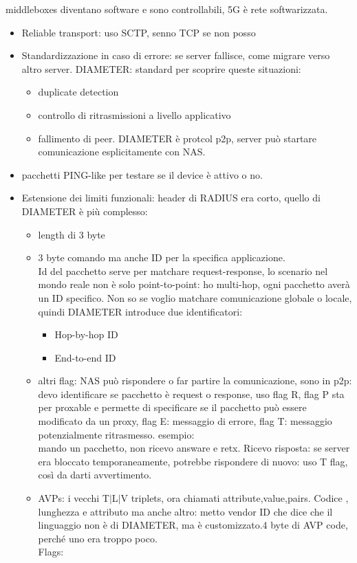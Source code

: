 \documentclass[16px]{article}
\begin{document}
middleboxes diventano software e sono controllabili, 5G è rete softwarizzata.\\
\begin{itemize}
\item Reliable transport: uso SCTP, senno TCP se non posso
\item Standardizzazione in caso di errore: se server fallisce, come migrare verso altro server. DIAMETER: standard per scoprire queste situazioni:
\begin{itemize}
\item duplicate detection
\item controllo di ritrasmissioni a livello applicativo
\item fallimento di peer. DIAMETER è protcol p2p, server può startare comunicazione esplicitamente con NAS.
\end{itemize}
\item pacchetti PING-like per testare se il device è attivo o no.
\item Estensione dei limiti funzionali: header di RADIUS era corto, quello di DIAMETER è più complesso:  
\begin{itemize}
\item length di 3 byte
\item 3 byte comando ma anche ID per la specifica applicazione.\\ Id del pacchetto serve per matchare request-response, lo scenario nel mondo reale non è solo point-to-point: ho multi-hop, ogni pacchetto averà un ID specifico. Non so se voglio matchare comunicazione globale o locale, quindi DIAMETER introduce due identificatori:
\begin{itemize}
\item Hop-by-hop ID
\item End-to-end ID
\end{itemize}
\item altri flag: NAS può rispondere o far partire la comunicazione, sono in p2p: devo identificare se pacchetto è request o response, uso flag R, flag P sta per proxable e permette di specificare se il pacchetto può essere modificato da un proxy, flag E: messaggio di errore, flag T: messaggio potenzialmente ritrasmesso. esempio: \\ mando un pacchetto, non ricevo answare e retx. Ricevo risposta: se server era bloccato temporaneamente, potrebbe rispondere di nuovo: uso T flag, così da darti avvertimento.
\item AVPs: i vecchi T$|$L$|$V triplets, ora chiamati attribute,value,pairs. Codice , lunghezza e attributo ma anche altro: metto vendor ID che dice che il linguaggio non è di DIAMETER, ma è customizzato.4 byte di AVP code, perché uno era troppo poco.\\ Flags:

\end{itemize}
\end{itemize}
\end{document}
